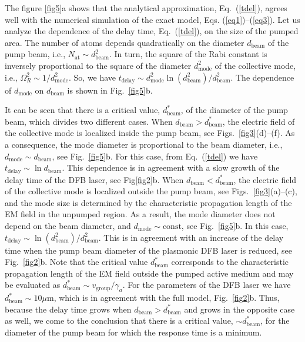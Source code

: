 \documentclass[aps,prapplied,amsmath,amssymb,onecolumn,superscriptaddress,showpacs,floatfix,longbibliography]{revtex4-1}
\begin{document}
The figure \ref{fig5}a shows that the analytical approximation, Eq.~(\ref{tdel}), agrees well with the numerical simulation of the exact model, Eqs. (\ref{eq1})--(\ref{eq3}).
Let us analyze the dependence of the delay time, Eq.~(\ref{tdel}), on the size of the pumped area.
The number of atoms depends quadratically on the diameter $d_{\text{beam}}$ of the pump beam, i.e., $N_{\text{at}} \sim d_{\text{beam}}^2$.
In turn, the square of the Rabi constant is inversely proportional to the square of the diameter $d_{\text{mode}}^2$ of the collective mode, i.e., $\Omega_{R}^{2} \sim 1/d_{\text{mode}}^2$.
So, we have $t_{\text{delay}} \sim d_{\text{mode}}^2\ln \left( d_{\text{beam}}^2 \right ) /d_{\text{beam}}^2$.
The dependence of $d_{\text{mode}}$ on $d_{\text{beam}}$ is shown in Fig.~\ref{fig5}b.

It can be seen that there is a critical value, $d_{\text{beam}}^*$, of the diameter of the pump beam, which divides two different cases.
When $d_{\text{beam}}>d_{\text{beam}}^*$, the electric field of the collective mode is localized inside the pump beam, see Figs.~\ref{fig3}(d)--(f).
As a consequence, the mode diameter is proportional to the beam diameter, i.e., $d_{\text{mode}} \sim d_{\text{beam}}$, see Fig.~\ref{fig5}b.
For this case, from Eq.~(\ref{tdel}) we have $t_{\text{delay}} \sim \ln d_{\text{beam}}$.
This dependence is in agreement with a slow growth of the delay time of the DFB laser, see Fig\ref{fig2}b.
When $d_{\text{beam}}<d_{\text{beam}}^*$, the electric field of the collective mode is localized outside the pump beam, see Figs.~\ref{fig3}(a)--(c), and the mode size is determined by the characteristic propagation length of the EM field in the unpumped region.
As a result, the mode diameter does not depend on the beam diameter, and $d_{\text{mode}} \sim \text{const}$, see Fig.~\ref{fig5}b.
In this case, $t_{\text{delay}} \sim \ln(d_{\text{beam}}^2)/d_{\text{beam}}^2$.
This is in agreement with an increase of the delay time  when the pump beam diameter of the plasmonic DFB laser is reduced, see Fig.~\ref{fig2}b.
Note that the critical value $d_{\text{beam}}^*$ corresponds to the characteristic propagation length of the EM field outside the pumped active medium and may be evaluated as $d_{\text{beam}}^* \sim v_{\text{group}}/\gamma_a$.
For the parameters of the DFB laser we have $d_{\text{beam}}^* \sim 10 \mu \text{m}$, which is in agreement with the full model, Fig.~\ref{fig2}b.
Thus, because the delay time grows when $d_{\text{beam}}>d_{\text{beam}}^*$ and grows in the opposite case as well, we come to the conclusion that there is a critical value, $\sim d_{\text{beam}}^*$, for the diameter of the pump beam for which the response time is a minimum.
\end{document}
